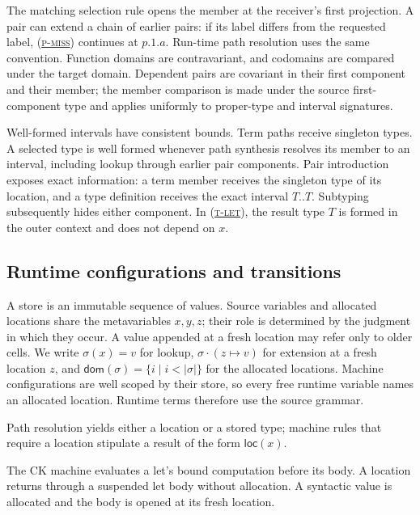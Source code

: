 \documentclass[acmsmall,screen,nonacm]{acmart}
\newcommand{\ruleref}[1]{%
  \textsc{(\hyperref[rule:#1]{#1})}}
\newcommand{\loc}[1]{\mathsf{loc}(#1)}
\newcommand{\rulesetup}{%
  \small
  \smallrulenames
  \setlength{\afterruleskip}{2em plus 0.2em minus 0.1em}%
  \setlength{\labelminsep}{0.6em}%
  \renewcommand{\arraystretch}{1.15}%
  \renewcommand{\andalso}{\qquad}%
}
\begin{document}
The matching selection rule opens the member at the receiver's first
projection. A pair can extend a chain of earlier pairs: if its label differs
from the requested label, \ruleref{p-miss} continues at \(p.1.a\). Run-time
path resolution uses the same convention. Function domains are contravariant,
and codomains are compared under the target domain. Dependent pairs are
covariant in their first component and their member; the member comparison
is made under the source first-component type and applies uniformly to
proper-type and interval signatures.

Well-formed intervals have consistent bounds. Term paths receive singleton
types. A selected type is well formed whenever path synthesis resolves its
member to an interval, including lookup through earlier pair components.
Pair introduction exposes exact information: a term member
receives the singleton type of its location, and a type definition receives
the exact interval \(T..T\). Subtyping subsequently hides either component. In
\ruleref{t-let}, the result type \(T\) is formed in the outer context and does
not depend on \(x\).

\subsection{Runtime configurations and transitions}
\label{sec:machine}

A store is an immutable sequence of values. Source variables and allocated
locations share the metavariables \(x,y,z\); their role is determined by the
judgment in which they occur. A value appended at a fresh location may refer
only to older cells. We write \(\sigma(x)=v\) for lookup,
\(\sigma\mathbin{\cdot}(z\mapsto v)\) for extension at a fresh location
\(z\), and
\(\mathsf{dom}(\sigma)=\{i\mid i<|\sigma|\}\) for the allocated locations.
Machine configurations are well scoped by their store, so every free runtime
variable names an allocated location. Runtime terms therefore use the source
grammar.

Path resolution yields either a location or a stored type; machine rules that
require a location stipulate a result of the form \(\loc{x}\).

The CK machine evaluates a let's bound computation before its body. A location
returns through a suspended let body without allocation. A syntactic value is
allocated and the body is opened at its fresh location.

\clearpage
\begingroup
\setlength{\abovedisplayskip}{5pt plus 1pt minus 1pt}
\setlength{\belowdisplayskip}{5pt plus 1pt minus 1pt}
\setlength{\intextsep}{4pt}
\captionsetup{skip=6pt}
\rulesetup
\end{document}
